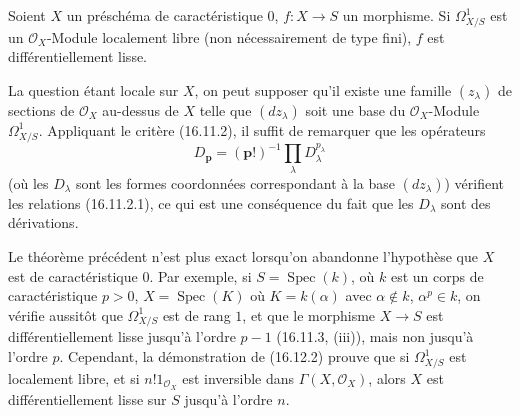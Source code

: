 \begin{theorem}[16.12.2]
\label{IV.16.12.2}
Soient $X$ un préschéma de caractéristique $0$, $f:X\to S$ un morphisme. Si
$\Omega_{X/S}^1$ est un $\mathcal{O}_X$-Module localement libre (non
nécessairement de type fini), $f$ est différentiellement lisse.
\end{theorem}

La question étant locale sur $X$, on peut supposer qu'il existe une famille
$(z_\lambda)$ de sections de $\mathcal{O}_X$ au-dessus de $X$ telle que
$(dz_\lambda)$ soit une base du $\mathcal{O}_X$-Module $\Omega_{X/S}^1$.
Appliquant le critère (16.11.2), il suffit de remarquer que les opérateurs
\[
  D_{\mathbf{p}}=(\mathbf{p}!)^{-1}
  \prod_\lambda D_\lambda^{p_\lambda}
\]
(où les $D_\lambda$ sont les formes coordonnées correspondant à la base
$(dz_\lambda)$) vérifient les relations (16.11.2.1), ce qui est une
conséquence du fait que les $D_\lambda$ sont des dérivations.

\begin{env}[16.12.3]
\label{IV.16.12.3}
Le théorème précédent n'est plus exact lorsqu'on abandonne l'hypothèse que
$X$ est de caractéristique $0$. Par exemple, si
$S=\operatorname{Spec}(k)$, où $k$ est un corps de caractéristique $p>0$,
$X=\operatorname{Spec}(K)$ où $K=k(\alpha)$ avec
$\alpha\notin k$, $\alpha^p\in k$, on vérifie aussitôt
que $\Omega_{X/S}^1$ est de rang $1$, et que le morphisme $X\to S$ est
différentiellement lisse jusqu'à l'ordre $p-1$ (16.11.3, (iii)), mais non
jusqu'à l'ordre $p$. Cependant, la démonstration de (16.12.2) prouve que si
$\Omega_{X/S}^1$ est localement libre, et si $n!1_{\mathcal{O}_X}$ est
inversible dans $\Gamma(X,\mathcal{O}_X)$, alors $X$ est différentiellement
lisse sur $S$ jusqu'à l'ordre $n$.
\end{env}
